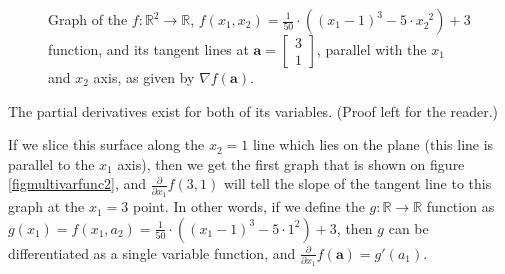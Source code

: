 \documentclass{article}
\begin{document}
            \begin{figure}[!htb]
              \centering
              \caption{%
                Graph of the $f : \mathbb{R}^2 \rightarrow \mathbb{R}$,
                $
                  f(x_1, x_2)
                    = \frac{1}{50}
                      \cdot
                      \left( (x_1 - 1)^3 - 5 \cdot x_2^{\enspace 2} \right) + 3
                $
                function, and its tangent lines at
                $\mathbf{a} = \begin{bmatrix} 3 \\ 1 \end{bmatrix}$,
                parallel with the $x_1$ and $x_2$ axis, as given by
                $\nabla f(\mathbf{a})$.
              } \label{figmultivarfunc1}
            \end{figure}

            The partial derivatives exist for both of its variables. (Proof
            left for the reader.)

            If we slice this surface along the $x_2 = 1$ line which lies on the
            plane (this line is parallel to the $x_1$ axis), then we get the
            first graph that is shown on figure \ref{figmultivarfunc2}, and
            $\frac{\partial}{\partial x_1} f(3, 1)$ will tell the slope of the
            tangent line to this graph at the $x_1 = 3$ point. In other words,
            if we define the $g : \mathbb{R} \rightarrow \mathbb{R}$ function as
            $
              g(x_1) = f(x_1, a_2)
                = \frac{1}{50} \cdot \left( (x_1 - 1)^3 - 5 \cdot 1^2 \right) + 3
            $, then $g$ can be differentiated as a single variable function, and
            $\frac{\partial}{\partial x_1} f(\mathbf{a}) = g'(a_1)$.
\end{document}
